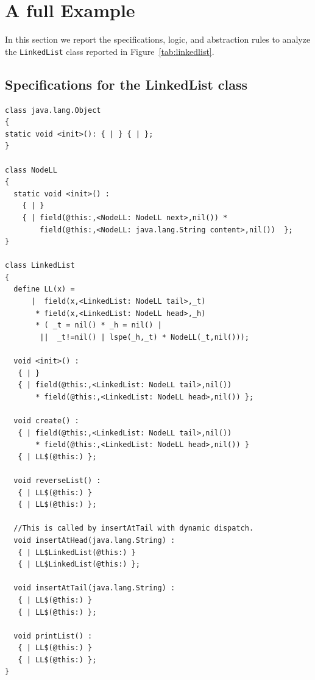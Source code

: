 \documentclass[11pt]{article}
\begin{document}
\section{A full Example}
In this section we report the specifications, logic, and abstraction rules to analyze the {\tt LinkedList} class
 reported in Figure~\ref{tab:linkedlist}.
\subsection{Specifications for the LinkedList class}
\begin{verbatim}
class java.lang.Object 
{
static void <init>(): { | } { | };
}

class NodeLL
{
  static void <init>() : 
    { | } 
    { | field(@this:,<NodeLL: NodeLL next>,nil()) * 
        field(@this:,<NodeLL: java.lang.String content>,nil())  };
}

class LinkedList
{
  define LL(x) =  
      |  field(x,<LinkedList: NodeLL tail>,_t) 
       * field(x,<LinkedList: NodeLL head>,_h) 
       * ( _t = nil() * _h = nil() | 
        ||  _t!=nil() | lspe(_h,_t) * NodeLL(_t,nil())); 
       
  void <init>() : 
   { | } 
   { | field(@this:,<LinkedList: NodeLL tail>,nil()) 
       * field(@this:,<LinkedList: NodeLL head>,nil()) };

  void create() : 
   { | field(@this:,<LinkedList: NodeLL tail>,nil()) 
       * field(@this:,<LinkedList: NodeLL head>,nil()) }
   { | LL$(@this:) };

  void reverseList() : 
   { | LL$(@this:) } 
   { | LL$(@this:) };

  //This is called by insertAtTail with dynamic dispatch.
  void insertAtHead(java.lang.String) : 
   { | LL$LinkedList(@this:) } 
   { | LL$LinkedList(@this:) };

  void insertAtTail(java.lang.String) : 
   { | LL$(@this:) } 
   { | LL$(@this:) };

  void printList() : 
   { | LL$(@this:) } 
   { | LL$(@this:) };
}
\end{verbatim}
\end{document}
